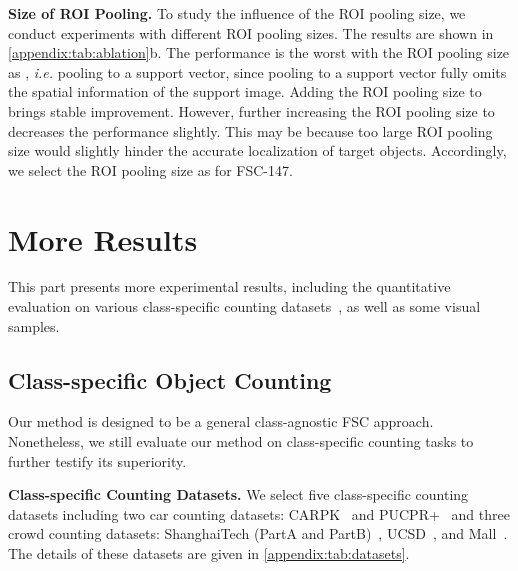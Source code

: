 \documentclass[10pt,twocolumn,letterpaper]{article}
\begin{document}
\vspace{2pt}\noindent\textbf{Size of ROI Pooling.} 
To study the influence of the ROI pooling size, we conduct experiments with different ROI pooling sizes. 
The results are shown in \cref{appendix:tab:ablation}b. 
The performance is the worst with the ROI pooling size as , \textit{i.e.} pooling to a support vector, since pooling to a support vector fully omits the spatial information of the support image.
Adding the ROI pooling size to  brings stable improvement. 
However, further increasing the ROI pooling size to  decreases the performance slightly. 
This may be because too large ROI pooling size would slightly hinder the accurate localization of target objects. 
Accordingly, we select the ROI pooling size as  for FSC-147. 

 \section{More Results}\label{appendix:sec:results}








This part presents more experimental results, including the quantitative evaluation on various class-specific counting datasets~\cite{lpn, ucsd, mall, mcnn}, as well as some visual samples.


\subsection{Class-specific Object Counting}

Our method is designed to be a general class-agnostic FSC approach. Nonetheless, we still evaluate our method on class-specific counting tasks to further testify its superiority. 

\vspace{2pt}\noindent \textbf{Class-specific Counting Datasets.} We select five class-specific counting datasets including two car counting datasets: CARPK~\cite{lpn} and PUCPR+~\cite{lpn} and three crowd counting datasets: ShanghaiTech (PartA and PartB)~\cite{mcnn}, UCSD~\cite{ucsd}, and Mall~\cite{mall}. The details of these datasets are given in \cref{appendix:tab:datasets}. 
\end{document}
